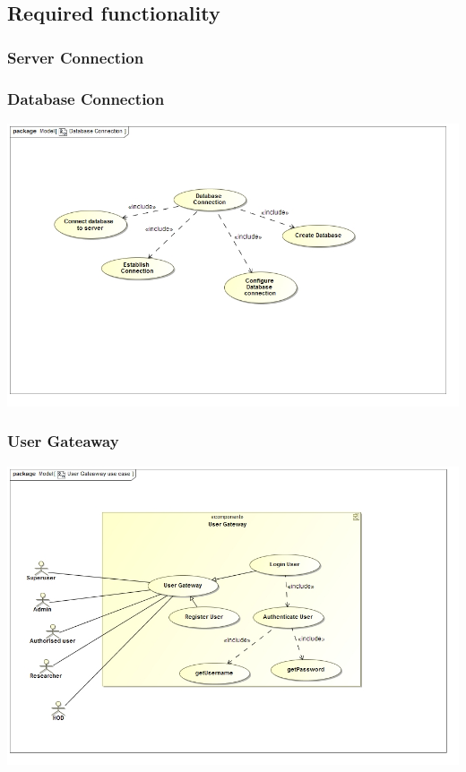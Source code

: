 \documentclass[11pt]{article}
\begin{document}
	\subsection{Required functionality}
	
	\subsubsection{Server Connection}
	\subsubsection{Database Connection}
	\begin{center}
		\includegraphics[width=\textwidth]{../Images/DatabaseConnectionUC.jpg}\\[0.5cm]
	\end{center}
	\subsubsection{User Gateaway}
	\begin{center}
		\includegraphics[width=\textwidth]{../Images/UserGateawayUC.jpg}\\[0.5cm]
	\end{center}
\end{document}
